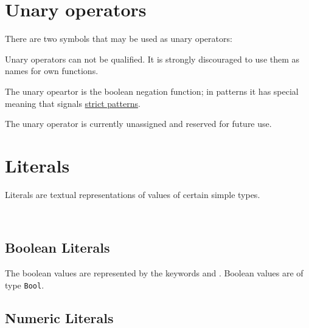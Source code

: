 \section{Unary operators}

There are two symbols that may be used as unary operators:

\begin{flushleft}
 \sym{!} \oder{} 
\end{flushleft}

Unary operators can not be qualified. It is strongly discouraged to use them as names for own functions.

The unary opeartor \sym{!} is the boolean negation function; in patterns it has special meaning that signals  \hyperref[strictpats]{strict patterns}.

The unary operator  is currently unassigned and reserved for future use. 

\section{Literals}

Literals are textual representations of values of certain simple types.

\begin{flushleft}
  \oder{}  \alt{}  \oder{}  \oder{} \\
  \oder{} 
\end{flushleft}


\subsection{Boolean Literals}

The boolean values are represented by the keywords  and . Boolean values are of type \texttt{Bool}.

\begin{flushleft}
  \oder{} 
\end{flushleft}

\subsection{Numeric Literals}

